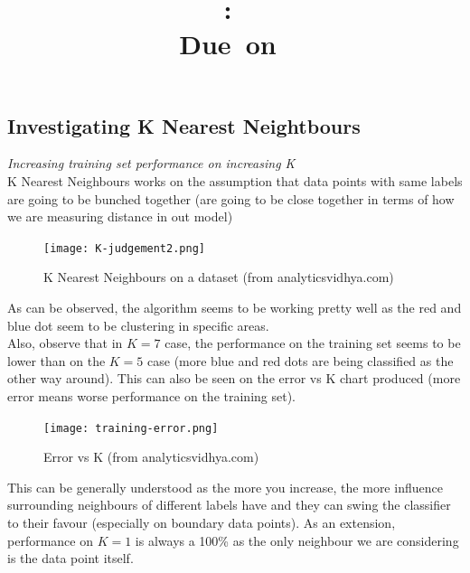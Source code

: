 \documentclass{article}
\title{
\vspace{2in}
\textmd{\textbf{\hmwkClass:\ \hmwkTitle}}\\
\normalsize\vspace{0.1in}\small{Due\ on\ \hmwkDueDate}\\
\vspace{0.1in}
\vspace{3in}
}
\author{\textbf{\hmwkAuthorName}}
\begin{document}
\maketitle
\clearpage


\subsection{Investigating K Nearest Neightbours}
\textit{Increasing training set performance on increasing K}\\

K Nearest Neighbours works on the assumption that data points with same labels are going to be bunched together (are going to be close together in terms of how we are measuring distance in out model)\\

\begin{figure}[h!]
    \centering
    \texttt{[image: K-judgement2.png]}
    \caption{K Nearest Neighbours on a dataset (from analyticsvidhya.com)}
    \label{fig:fig1}
\end{figure}

As can be observed, the algorithm seems to be working pretty well as the red and blue dot seem to be clustering in specific areas.\\

Also, observe that in $K=7$ case, the performance on the training set seems to be lower than on the $K=5$ case (more blue and red dots are being classified as the other way around). This can also be seen on the error vs K chart produced (more error means worse performance on the training set).\\ 

\begin{figure}[h!]
    \centering
    \texttt{[image: training-error.png]}
    \caption{Error vs K (from analyticsvidhya.com)}
    \label{fig:fig2}
\end{figure}

This can be generally understood as the more you increase, the more influence surrounding neighbours of different labels have and they can swing the classifier to their favour (especially on boundary data points). As an extension, performance on $K=1$ is always a 100\% as the only neighbour we are considering is the data point itself.\\
\end{document}
